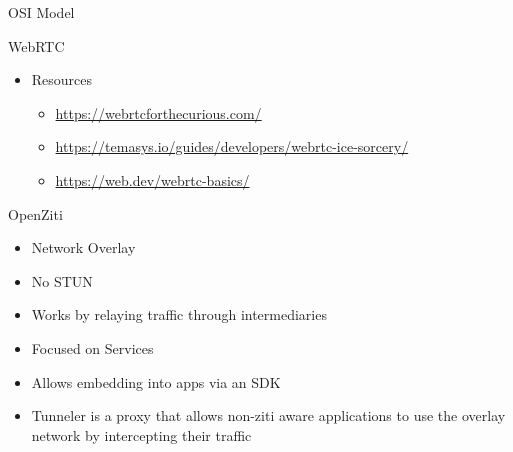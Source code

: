 \begin{frame}[fragile]{OSI Model}
\begin{block}{WebRTC}
\begin{itemize}
  \begin{itemize}
  \tightlist
  \item
    \url{https://github.com/pion/webrtc}
  \item
    https://github.com/pion/awesome-pion
  \item
    \url{https://github.com/pojntfx/weron}
  \item
    https://github.com/takutakahashi/wg-connect
  \item
    https://github.com/stv0g/cunicu
  \item
    https://github.com/gavv/webrtc-cli
  \item
    https://github.com/szpnygo/gtc
  \item
    https://github.com/cretz/webrtc-ipfs-signaling
  \item
    https://github.com/pion/example-webrtc-applications
  \item
    https://github.com/pion/webrtc/tree/master/examples
  \end{itemize}
\item
  Resources

  \begin{itemize}
  \tightlist
  \item
    \url{https://webrtcforthecurious.com/}
  \item
    \url{https://temasys.io/guides/developers/webrtc-ice-sorcery/}
  \item
    \href{https://web.dev/webrtc-basics/\#toc-rtcpeerconnection}{https://web.dev/webrtc-basics/}
  \end{itemize}
\end{itemize}
\end{block}

\begin{block}{OpenZiti}
\protect\hypertarget{openziti}{}
\begin{itemize}
\tightlist
\item
  Network Overlay
\item
  No STUN
\item
  Works by relaying traffic through intermediaries
\item
  Focused on Services
\item
  Allows embedding into apps via an SDK
\item
  Tunneler is a proxy that allows non-ziti aware applications to use the
  overlay network by intercepting their traffic
\end{itemize}
\end{block}
\end{frame}

